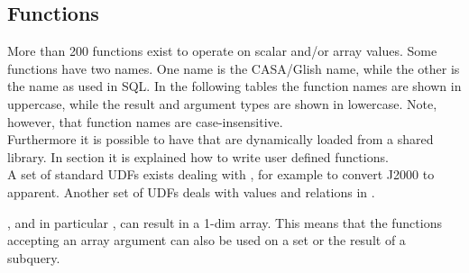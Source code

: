 \subsection{\label{TAQL:FUNCTIONS}Functions}
More than 200 functions exist to operate on scalar and/or array values.
Some functions have two names. One name is the CASA/Glish name, while the
other is the name as used in SQL.
In the following tables the function names are shown in uppercase,
while the result and argument types are shown in lowercase.
Note, however, that function names are case-insensitive.
\\Furthermore it is possible to have 
that are dynamically loaded from a shared library. In section
 it is
explained how to write user defined functions.
\\A set of standard UDFs exists dealing with
, for example to
convert J2000 to apparent.
Another set of UDFs deals with values and relations in
. 

, and in particular
, can result in a 1-dim array.
This means that the functions accepting an array argument can also
be used on a set or the result of a subquery.


